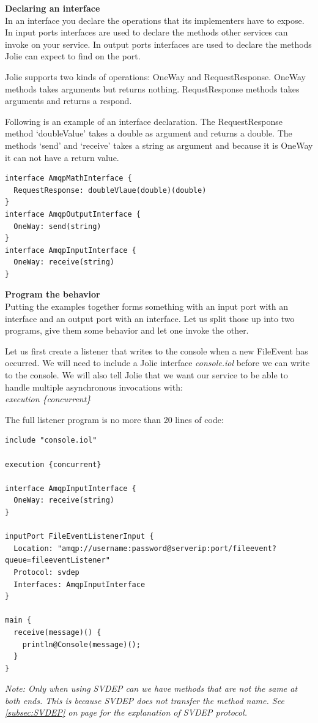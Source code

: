 \noindent\textbf{Declaring an interface}\\
In an interface you declare the operations that its implementers have to expose. In input ports interfaces are used to declare the methods other services can invoke on your service. In output ports interfaces are used to declare the methods Jolie can expect to find on the port.

Jolie supports two kinds of operations: OneWay and RequestResponse. OneWay methods takes arguments but returns nothing. RequstResponse methods takes arguments and returns a respond.

Following is an example of an interface declaration. The RequestResponse method `doubleValue' takes a double as argument and returns a double. The methods `send' and `receive' takes a string as argument and because it is OneWay it can not have a return value.

\begin{lstlisting}
interface AmqpMathInterface {
  RequestResponse: doubleVlaue(double)(double)
}
interface AmqpOutputInterface {
  OneWay: send(string)
}
interface AmqpInputInterface {
  OneWay: receive(string)
}
\end{lstlisting}

\noindent\textbf{Program the behavior}\\
Putting the examples together forms something with an input port with an interface and an output port with an interface. Let us split those up into two programs, give them some behavior and let one invoke the other.

Let us first create a listener that writes to the console when a new FileEvent has occurred. We will need to include a Jolie interface \textit{console.iol} before we can write to the console. We will also tell Jolie that we want our service to be able to handle multiple asynchronous invocations with:\\
\indent\textit{execution \{concurrent\}}

The full listener program is no more than 20 lines of code:

\begin{lstlisting}
include "console.iol"

execution {concurrent}

interface AmqpInputInterface {
  OneWay: receive(string)
}

inputPort FileEventListenerInput {
  Location: "amqp://username:password@serverip:port/fileevent?queue=fileeventListener"
  Protocol: svdep
  Interfaces: AmqpInputInterface
}

main {
  receive(message)() {
    println@Console(message)();
  }
}
\end{lstlisting}
\textit{Note: Only when using SVDEP can we have methods that are not the same at both ends. This is because SVDEP does not transfer the method name. See \ref{subsec:SVDEP} on page \pageref{subsec:SVDEP} for the explanation of SVDEP protocol.}

